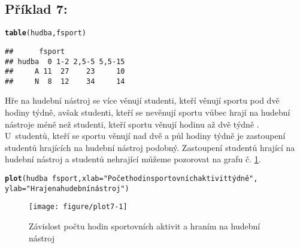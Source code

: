 \documentclass[twoside]{article}\usepackage[]{graphicx}\usepackage[]{color}
\makeatletter
\def\maxwidth{ %
  \ifdim\Gin@nat@width>\linewidth
    \linewidth
  \else
    \Gin@nat@width
  \fi
}
\newcommand{\hlstr}[1]{\textcolor[rgb]{0.192,0.494,0.8}{#1}}%
\newcommand{\hlopt}[1]{\textcolor[rgb]{0,0,0}{#1}}%
\newcommand{\hlstd}[1]{\textcolor[rgb]{0.345,0.345,0.345}{#1}}%
\newcommand{\hlkwc}[1]{\textcolor[rgb]{0.333,0.667,0.333}{#1}}%
\newcommand{\hlkwd}[1]{\textcolor[rgb]{0.737,0.353,0.396}{\textbf{#1}}}%
\newenvironment{kframe}{%
 \def\at@end@of@kframe{}%
 \ifinner\ifhmode%
  \def\at@end@of@kframe{\end{minipage}}%
  \begin{minipage}{\columnwidth}%
 \fi\fi%
 \def\FrameCommand##1{\hskip\@totalleftmargin \hskip-\fboxsep
 \colorbox{shadecolor}{##1}\hskip-\fboxsep
     \hskip-\linewidth \hskip-\@totalleftmargin \hskip\columnwidth}%
 \MakeFramed {\advance\hsize-\width
   \@totalleftmargin\z@ \linewidth\hsize
   \@setminipage}}%
 {\par\unskip\endMakeFramed%
 \at@end@of@kframe}
\newenvironment{knitrout}{}{} %
\makeatother
\begin{document}
\subsection*{Příklad 7:}
\begin{knitrout}
\color{fgcolor}\begin{kframe}
\begin{alltt}
\hlkwd{table}\hlstd{(hudba,fsport)}
\end{alltt}
\begin{verbatim}
##      fsport
## hudba  0 1-2 2,5-5 5,5-15
##     A 11  27    23     10
##     N  8  12    34     14
\end{verbatim}
\end{kframe}
\end{knitrout}

Hře na hudební nástroj se více věnují studenti, kteří věnují sportu pod dvě hodiny týdně, avšak studenti, kteří se nevěnují sportu vůbec hrají na hudební nástroje méně než studenti, kteří sportu věnují hodinu až dvě týdně . U~studentů, kteří se sportu věnují nad dvě a půl hodiny týdně je zastoupení studentů hrajících na hudební nástroj podobný. Zastoupení studentů hrající na hudební nástroj a studentů nehrající můžeme pozorovat na grafu č. \ref{fig:plot7}.

\begin{knitrout}
\color{fgcolor}\begin{kframe}
\begin{alltt}
\hlkwd{plot}\hlstd{(hudba}\hlopt{~}\hlstd{fsport,} \hlkwc{xlab}\hlstd{=}\hlstr{"Počet hodin sportovních aktivit týdně"}\hlstd{,}
    \hlkwc{ylab}\hlstd{=}\hlstr{"Hraje na hudební nástroj"}\hlstd{)}
\end{alltt}
\end{kframe}\begin{figure}[h]
\texttt{[image: figure/plot7-1]} \caption[Závislost počtu hodin sportovních aktivit a hraním na hudební nástroj]{Závislost počtu hodin sportovních aktivit a hraním na hudební nástroj}\label{fig:plot7}
\end{figure}


\end{knitrout}
\end{document}
